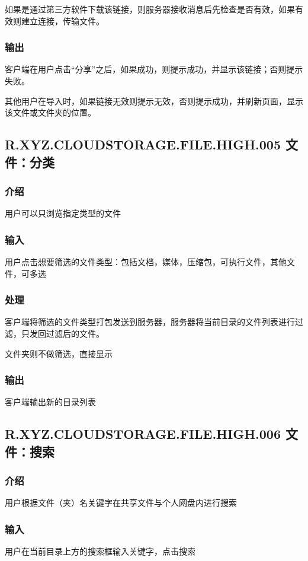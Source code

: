 如果是通过第三方软件下载该链接，则服务器接收消息后先检查是否有效，如果有效则建立连接，传输文件。

\subsubsection{输出} 
客户端在用户点击“分享”之后，如果成功，则提示成功，并显示该链接；否则提示失败。
 
其他用户在导入时，如果链接无效则提示无效，否则提示成功，并刷新页面，显示该文件或文件夹的位置。


\subsection{R.XYZ.CLOUDSTORAGE.FILE.HIGH.005 文件：分类}

\subsubsection{介绍}
用户可以只浏览指定类型的文件

\subsubsection{输入} 
用户点击想要筛选的文件类型：包括文档，媒体，压缩包，可执行文件，其他文件，可多选
\subsubsection{处理} 
客户端将筛选的文件类型打包发送到服务器，服务器将当前目录的文件列表进行过滤，只发回过滤后的文件。

文件夹则不做筛选，直接显示

\subsubsection{输出} 
客户端输出新的目录列表

\subsection{R.XYZ.CLOUDSTORAGE.FILE.HIGH.006 文件：搜索}

\subsubsection{介绍}
用户根据文件（夹）名关键字在共享文件与个人网盘内进行搜索

\subsubsection{输入} 
用户在当前目录上方的搜索框输入关键字，点击搜索
